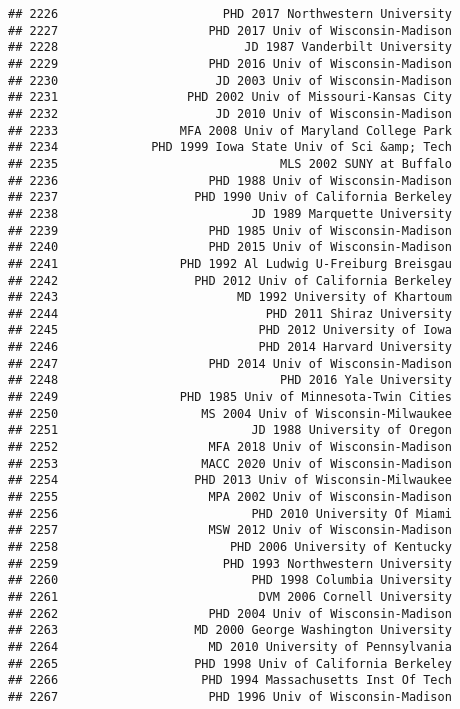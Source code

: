 \documentclass[
]{article}
\begin{document}
\begin{verbatim}
## 2226                       PHD 2017 Northwestern University
## 2227                     PHD 2017 Univ of Wisconsin-Madison
## 2228                          JD 1987 Vanderbilt University
## 2229                     PHD 2016 Univ of Wisconsin-Madison
## 2230                      JD 2003 Univ of Wisconsin-Madison
## 2231                  PHD 2002 Univ of Missouri-Kansas City
## 2232                      JD 2010 Univ of Wisconsin-Madison
## 2233                 MFA 2008 Univ of Maryland College Park
## 2234             PHD 1999 Iowa State Univ of Sci &amp; Tech
## 2235                               MLS 2002 SUNY at Buffalo
## 2236                     PHD 1988 Univ of Wisconsin-Madison
## 2237                   PHD 1990 Univ of California Berkeley
## 2238                           JD 1989 Marquette University
## 2239                     PHD 1985 Univ of Wisconsin-Madison
## 2240                     PHD 2015 Univ of Wisconsin-Madison
## 2241                 PHD 1992 Al Ludwig U-Freiburg Breisgau
## 2242                   PHD 2012 Univ of California Berkeley
## 2243                         MD 1992 University of Khartoum
## 2244                             PHD 2011 Shiraz University
## 2245                            PHD 2012 University of Iowa
## 2246                            PHD 2014 Harvard University
## 2247                     PHD 2014 Univ of Wisconsin-Madison
## 2248                               PHD 2016 Yale University
## 2249                 PHD 1985 Univ of Minnesota-Twin Cities
## 2250                    MS 2004 Univ of Wisconsin-Milwaukee
## 2251                           JD 1988 University of Oregon
## 2252                     MFA 2018 Univ of Wisconsin-Madison
## 2253                    MACC 2020 Univ of Wisconsin-Madison
## 2254                   PHD 2013 Univ of Wisconsin-Milwaukee
## 2255                     MPA 2002 Univ of Wisconsin-Madison
## 2256                           PHD 2010 University Of Miami
## 2257                     MSW 2012 Univ of Wisconsin-Madison
## 2258                        PHD 2006 University of Kentucky
## 2259                       PHD 1993 Northwestern University
## 2260                           PHD 1998 Columbia University
## 2261                            DVM 2006 Cornell University
## 2262                     PHD 2004 Univ of Wisconsin-Madison
## 2263                   MD 2000 George Washington University
## 2264                     MD 2010 University of Pennsylvania
## 2265                   PHD 1998 Univ of California Berkeley
## 2266                    PHD 1994 Massachusetts Inst Of Tech
## 2267                     PHD 1996 Univ of Wisconsin-Madison

\end{verbatim}
\end{document}
